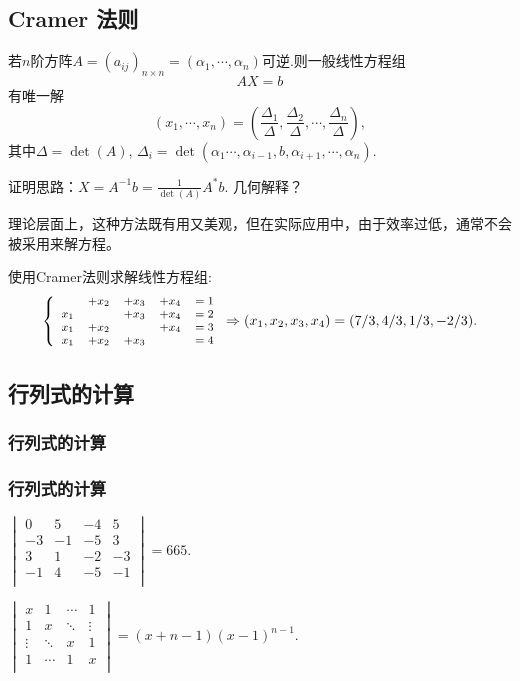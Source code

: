\subsection{Cramer 法则}

\begin{frame}
\begin{theorem}[Cramer法则] \small
若$n$阶方阵$A=(a_{ij})_{n\times n}=(\alpha_1,\cdots,\alpha_n)$可逆.则一般线性方程组
\[AX=b\]
有唯一解
\[(x_1,\cdots,x_n)=\left(\frac{\Delta_1}{\Delta},\frac{\Delta_2}{\Delta},\cdots,\frac{\Delta_n}{\Delta}\right),\]
其中$\Delta=\det(A)$, $\Delta_i=\det(\alpha_1\cdots,\alpha_{i-1},b,\alpha_{i+1},\cdots,\alpha_n)$.
\end{theorem}
\pp
证明思路：$X=A^{-1}b=\frac{1}{\det(A)} A^*b$. \pp 几何解释？
\pp

理论层面上，这种方法既有用又美观，但在实际应用中，由于效率过低，通常不会被采用来解方程。
\pp
\begin{example}
使用Cramer法则求解线性方程组:
\[\footnotesize \left\{\begin{array}{rrrrr}
& + x_2 & + x_3 & + x_4 & = 1\\
x_1 &       & + x_3 & + x_4 & = 2\\
x_1 & + x_2 &       & + x_4 & = 3\\
x_1 & + x_2 & + x_3 &       & = 4\\
\end{array}\right.  \Rightarrow (x_1,x_2,x_3,x_4)=(7/3,4/3,1/3,-2/3).\]
\end{example}
\end{frame}


\renewcommand{\mydate}{2025年03月27号\ 第十次课}

\subsection{行列式的计算}


\subsubsection{行列式的计算}
\begin{frame}\frametitle{行列式的计算}
\begin{example}
$\begin{vmatrix}
0& 5&-4& 5\\
-3&-1&-5& 3\\
3& 1&-2&-3\\
-1& 4&-5&-1\\
\end{vmatrix}=665$.
\end{example}
\pp
\begin{example}
$\begin{vmatrix}
x&     1&\cdots& 1\\
1&     x&\ddots&\vdots\\
\vdots&\ddots&     x& 1\\
1&\cdots&     1& x\\
\end{vmatrix}=(x+n-1)(x-1)^{n-1}$.
\end{example}
\end{frame}





